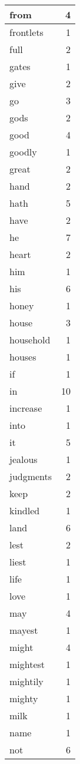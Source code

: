 \begin{center}
\begin{longtable}{l|r}
from & 4 \\ \hline
frontlets & 1 \\ \hline
full & 2 \\ \hline
gates & 1 \\ \hline
give & 2 \\ \hline
go & 3 \\ \hline
gods & 2 \\ \hline
good & 4 \\ \hline
goodly & 1 \\ \hline
great & 2 \\ \hline
hand & 2 \\ \hline
hath & 5 \\ \hline
have & 2 \\ \hline
he & 7 \\ \hline
heart & 2 \\ \hline
him & 1 \\ \hline
his & 6 \\ \hline
honey & 1 \\ \hline
house & 3 \\ \hline
household & 1 \\ \hline
houses & 1 \\ \hline
if & 1 \\ \hline
in & 10 \\ \hline
increase & 1 \\ \hline
into & 1 \\ \hline
it & 5 \\ \hline
jealous & 1 \\ \hline
judgments & 2 \\ \hline
keep & 2 \\ \hline
kindled & 1 \\ \hline
land & 6 \\ \hline
lest & 2 \\ \hline
liest & 1 \\ \hline
life & 1 \\ \hline
love & 1 \\ \hline
may & 4 \\ \hline
mayest & 1 \\ \hline
might & 4 \\ \hline
mightest & 1 \\ \hline
mightily & 1 \\ \hline
mighty & 1 \\ \hline
milk & 1 \\ \hline
name & 1 \\ \hline
not & 6 \\ \hline

\end{longtable}
\end{center}

